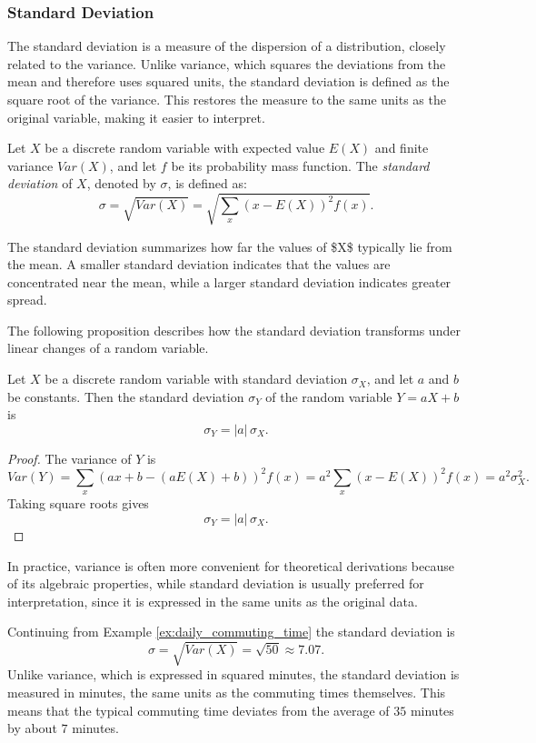 
\subsubsection*{Standard Deviation}

The standard deviation is a measure of the dispersion of a distribution, closely related to the variance. Unlike variance, which squares the deviations from the mean and therefore uses squared units, the standard deviation is defined as the square root of the variance. This restores the measure to the same units as the original variable, making it easier to interpret.

\begin{definition}
Let $X$ be a discrete random variable with expected value $E(X)$ and finite variance $Var(X)$, and let $f$ be its probability mass function. The \emph{standard deviation} of $X$, denoted by $\sigma$, is defined as:
\[
\sigma = \sqrt{Var(X)} = \sqrt{\sum_{x} (x - E(X))^2 f(x)}.
\]
\end{definition}

The standard deviation summarizes how far the values of \$X\$ typically lie from the mean. A smaller standard deviation indicates that the values are concentrated near the mean, while a larger standard deviation indicates greater spread.

The following proposition describes how the standard deviation transforms under linear changes of a random variable.

\begin{proposition}
Let $X$ be a discrete random variable with standard deviation $\sigma_X$, and let $a$ and $b$ be constants. Then the standard deviation $\sigma_Y$ of the random variable $Y = aX + b$ is
\[
\sigma_Y = |a| \, \sigma_X.
\]
\end{proposition}
\begin{proof}
The variance of $Y$ is
\[
Var(Y) = \sum_{x} (a x + b - (a E(X) + b))^2 f(x) = a^2 \sum_{x} (x - E(X))^2 f(x) = a^2 \sigma_X^2.
\]
Taking square roots gives
\[
\sigma_Y = |a| \, \sigma_X.
\]
\end{proof}

In practice, variance is often more convenient for theoretical derivations because of its algebraic properties, while standard deviation is usually preferred for interpretation, since it is expressed in the same units as the original data.

\begin{example}
Continuing from Example \ref{ex:daily_commuting_time} the standard deviation is
\[
\sigma = \sqrt{Var(X)} = \sqrt{50} \approx 7.07.
\]
Unlike variance, which is expressed in squared minutes, the standard deviation is measured in minutes, the same units as the commuting times themselves. This means that the typical commuting time deviates from the average of $35$ minutes by about $7$ minutes.
\end{example}

